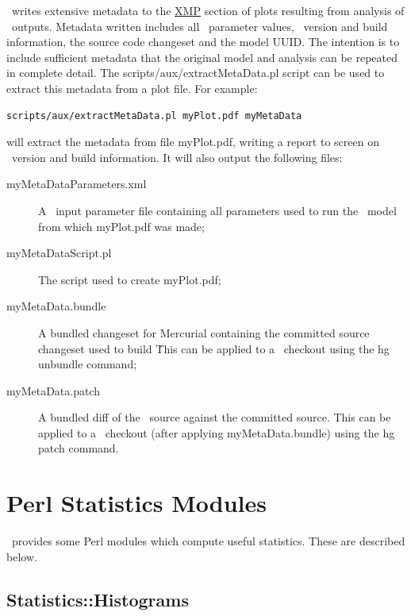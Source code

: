 \glc\ writes extensive metadata to the \href{http://en.wikipedia.org/wiki/Extensible_Metadata_Platform}{XMP} section of plots resulting from analysis of \glc\ outputs. Metadata written includes all \glc\ parameter values, \glc\ version and build information, the source code changeset and the model \gls{UUID}. The intention is to include sufficient metadata that the original model and analysis can be repeated in complete detail. The {\normalfont \ttfamily scripts/aux/extractMetaData.pl} script can be used to extract this metadata from a plot file. For example:
\begin{verbatim}
scripts/aux/extractMetaData.pl myPlot.pdf myMetaData
\end{verbatim}
will extract the metadata from file {\normalfont \ttfamily myPlot.pdf}, writing a report to screen on \glc\ version and build information. It will also output the following files:
\begin{description}
\item[{\normalfont \ttfamily myMetaDataParameters.xml}] A \glc\ input parameter file containing all parameters used to run the \glc\ model from which {\normalfont \ttfamily myPlot.pdf} was made;
\item[{\normalfont \ttfamily myMetaDataScript.pl}] The script used to create {\normalfont \ttfamily myPlot.pdf};
\item[{\normalfont \ttfamily myMetaData.bundle}] A bundled changeset for Mercurial containing the committed source changeset used to build \glc\. This can be applied to a \glc\ checkout using the {\normalfont \ttfamily hg unbundle} command;
\item[{\normalfont \ttfamily myMetaData.patch}] A bundled {\normalfont \ttfamily diff} of the \glc\ source against the committed source. This can be applied to a \glc\ checkout (after applying {\normalfont \ttfamily myMetaData.bundle}) using the {\normalfont \ttfamily hg patch} command.
\end{description}

\section{Perl Statistics Modules}

\glc\ provides some Perl modules which compute useful statistics. These are described below.

\subsection{{\normalfont \ttfamily Statistics::Histograms}}

